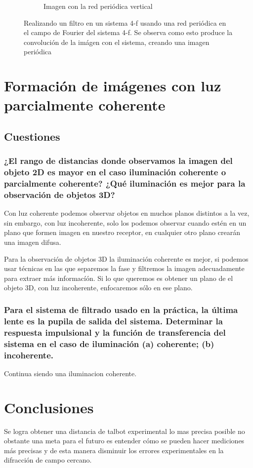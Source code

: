\documentclass{./packages/optica-article}
\begin{document}
\begin{figure}[hptb]
\begin{center}
\begin{subfigure}[t]{0.3\textwidth}
			\caption{Imagen con la red periódica vertical}
			\label{fig:filtrado:talbot:3}
		\end{subfigure}
		\caption{Realizando un filtro en un sistema 4-f usando una red periódica en el campo de Fourier del sistema 4-f. Se observa como esto produce la convolución de la imágen con el sistema, creando una imagen periódica}
		\label{fig:filtrado:all}
	\end{center}
\end{figure}


\section{Formación de imágenes con luz parcialmente coherente}

\subsection{Cuestiones}
\subsubsection{¿El rango de distancias donde observamos la imagen del objeto 2D es mayor en el caso iluminación coherente o parcialmente coherente? ¿Qué iluminación es mejor para la observación de objetos 3D?}

Con luz coherente podemos observar objetos en muchos planos distintos a la vez, sin embargo, con luz incoherente, solo los podemos observar cuando estén en un plano que formen imagen en nuestro receptor, en cualquier otro plano crearán una imagen difusa.

Para la observación de objetos 3D la iluminación coherente es mejor, si podemos usar técnicas en las que separemos la fase y filtremos la imagen adecuadamente para extraer más informacíón. Si lo que queremos es obtener un plano de el objeto 3D, con luz incoherente, enfocaremos sólo en ese plano.

\subsubsection{Para el sistema de filtrado usado en la práctica, la última lente es la pupila de salida del sistema. Determinar la respuesta impulsional y la función de transferencia del sistema en el caso de iluminación (a) coherente; (b) incoherente.}

Continua siendo una iluminacion coherente.


\section{Conclusiones}
Se logra obtener una distancia de talbot experimental lo mas precisa posible no obstante  una meta para el futuro es entender cómo se pueden hacer mediciones más precisas y de esta manera disminuir los errores experimentales en la difracción de campo cercano.


\end{document}
